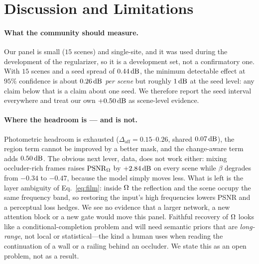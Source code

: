 \section{Discussion and Limitations}
\label{sec:conclusion}

\paragraph{What the community should measure.}
Our panel is small ($15$ scenes) and single-site, and it was used during the development of the
regularizer, so it is a development set, not a confirmatory one. With $15$ scenes and a seed spread
of $0.44\,\mathrm{dB}$, the minimum detectable effect at $95\%$ confidence is about $0.26\,\mathrm{dB}$ \emph{per
scene} but roughly $1\,\mathrm{dB}$ at the seed level: any claim below that is a claim about one seed. We
therefore report the seed interval everywhere and treat our own $+0.50\,\mathrm{dB}$ as scene-level evidence.

\paragraph{Where the headroom is --- and is not.}
Photometric headroom is exhausted ($\Delta_{\mathrm{aff}}=0.15$--$0.26$, shared
$0.07\,\mathrm{dB}$), the region term cannot be improved by a better mask, and the change-aware term
adds $0.50\,\mathrm{dB}$. The obvious next lever, data, does not work either: mixing occluder-rich
frames raises $\mathrm{PSNR}_\Omega$ by $+2.84\,\mathrm{dB}$ on every scene while $\beta$ degrades from
$-0.34$ to $-0.47$, because the model simply moves less. What is left is the layer
ambiguity of Eq.~\eqref{eq:film}: inside $\Omega$ the reflection and the scene occupy the same
frequency band, so restoring the input's high frequencies lowers PSNR and a perceptual
loss hedges. We see no evidence that a larger network, a new attention block or a new gate
would move this panel. Faithful recovery of $\Omega$ looks like a conditional-completion
problem and will need semantic priors that are \emph{long-range}, not local or
statistical---the kind a human uses when reading the continuation of a wall or a railing
behind an occluder. We state this as an open problem, not as a result.

